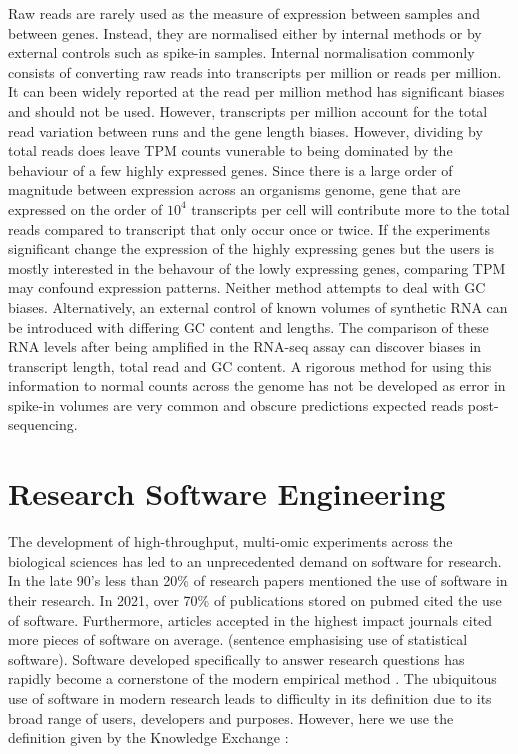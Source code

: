 \documentclass[../main.tex]{subfiles}
\begin{document}
Raw reads are rarely used as the measure of expression between samples and between genes. Instead, they are normalised either by internal methods or by external controls such as spike-in samples. Internal normalisation commonly consists of converting raw reads into transcripts per million or reads per million. It can been widely reported at the read per million method has significant biases and should not be used. However, transcripts per million account for the total read variation between runs and the gene length biases. However, dividing by total reads does leave TPM counts vunerable to being dominated by the behaviour of a few highly expressed genes. Since there is a large order of magnitude between expression across an organisms genome, gene that are expressed on the order of $10^4$ transcripts per cell will contribute more to the total reads compared to transcript that only occur once or twice. If the experiments significant change the expression of the highly expressing genes but the users is mostly interested in the behavour of the lowly expressing genes, comparing TPM may confound expression patterns. Neither method attempts to deal with GC biases. Alternatively, an external control of known volumes of synthetic RNA can be introduced with differing GC content and lengths. The comparison of these RNA levels after being amplified in the RNA-seq assay can discover biases in transcript length, total read and GC content. A rigorous method for using this information to normal counts across the genome has not be developed as error in spike-in volumes are very common and obscure predictions expected reads post-sequencing.

\section{Research Software Engineering}

The development of high-throughput, multi-omic experiments across the biological sciences has led to an unprecedented demand on software for research.
In the late 90's less than 20\% of research papers mentioned the use of software in their research. 
In 2021, over 70\% of publications stored on pubmed cited the use of software.
Furthermore, articles accepted in the highest impact journals cited more pieces of software on average. (sentence emphasising use of statistical software). 
Software developed specifically to answer research questions has rapidly become a cornerstone of the modern empirical method \cite{Schindler2022}.
The ubiquitous use of software in modern research leads to difficulty in its definition due to its broad range of users, developers and purposes.
However, here we use the definition given by the Knowledge Exchange \parencite{KL2016}:
 
\end{document}
